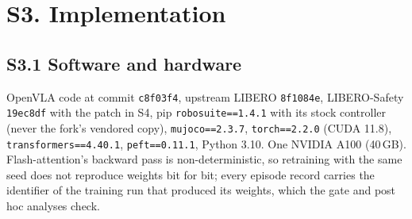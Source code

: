 \documentclass{article}
\begin{document}
\section*{S3. Implementation}

\subsection*{S3.1 Software and hardware}
OpenVLA code at commit \texttt{c8f03f4}, upstream LIBERO \texttt{8f1084e}, LIBERO-Safety \texttt{19ec8df} with the patch in S4, pip \texttt{robosuite==1.4.1} with its stock controller (never the fork's vendored copy), \texttt{mujoco==2.3.7}, \texttt{torch==2.2.0} (CUDA 11.8), \texttt{transformers==4.40.1}, \texttt{peft==0.11.1}, Python 3.10. One NVIDIA A100 (40\,GB). Flash-attention's backward pass is non-deterministic, so retraining with the same seed does not reproduce weights bit for bit; every episode record carries the identifier of the training run that produced its weights, which the gate and post hoc analyses check.
\end{document}
